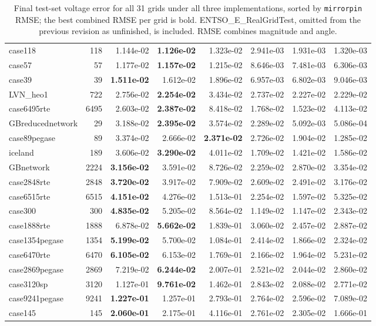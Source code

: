 \documentclass[10pt]{article}
\begin{document}
\begin{table}[H]
\begin{tabular}{lrrrrrrr}
case118 & 118 & 1.144e-02 & \textbf{1.126e-02} & 1.323e-02 & 2.941e-03 & 1.931e-03 & 1.320e-03 \\
case57 & 57 & 1.177e-02 & \textbf{1.157e-02} & 1.215e-02 & 8.646e-03 & 7.481e-03 & 6.306e-03 \\
case39 & 39 & \textbf{1.511e-02} & 1.612e-02 & 1.896e-02 & 6.957e-03 & 6.802e-03 & 9.046e-03 \\
LVN\_heo1 & 722 & 2.756e-02 & \textbf{2.254e-02} & 3.434e-02 & 2.737e-02 & 2.227e-02 & 2.229e-02 \\
case6495rte & 6495 & 2.603e-02 & \textbf{2.387e-02} & 8.418e-02 & 1.768e-02 & 1.523e-02 & 4.113e-02 \\
GBreducednetwork & 29 & 3.188e-02 & \textbf{2.395e-02} & 3.574e-02 & 2.289e-02 & 5.092e-03 & 5.086e-04 \\
case89pegase & 89 & 3.374e-02 & 2.666e-02 & \textbf{2.371e-02} & 2.726e-02 & 1.904e-02 & 1.285e-02 \\
iceland & 189 & 3.606e-02 & \textbf{3.290e-02} & 4.011e-02 & 1.709e-02 & 1.421e-02 & 1.586e-02 \\
GBnetwork & 2224 & \textbf{3.156e-02} & 3.591e-02 & 8.726e-02 & 2.259e-02 & 2.870e-02 & 3.354e-02 \\
case2848rte & 2848 & \textbf{3.720e-02} & 3.917e-02 & 7.909e-02 & 2.609e-02 & 2.491e-02 & 3.176e-02 \\
case6515rte & 6515 & \textbf{4.151e-02} & 4.276e-02 & 1.513e-01 & 2.254e-02 & 1.597e-02 & 5.325e-02 \\
case300 & 300 & \textbf{4.835e-02} & 5.205e-02 & 8.564e-02 & 1.149e-02 & 1.147e-02 & 2.343e-02 \\
case1888rte & 1888 & 6.878e-02 & \textbf{5.662e-02} & 1.839e-01 & 3.060e-02 & 2.457e-02 & 2.887e-02 \\
case1354pegase & 1354 & \textbf{5.199e-02} & 5.700e-02 & 1.084e-01 & 2.414e-02 & 1.866e-02 & 2.324e-02 \\
case6470rte & 6470 & \textbf{6.105e-02} & 6.153e-02 & 1.769e-01 & 2.166e-02 & 1.964e-02 & 5.231e-02 \\
case2869pegase & 2869 & 7.219e-02 & \textbf{6.244e-02} & 2.007e-01 & 2.521e-02 & 2.044e-02 & 2.860e-02 \\
case3120sp & 3120 & 1.127e-01 & \textbf{9.761e-02} & 1.462e-01 & 2.843e-02 & 2.088e-02 & 2.771e-02 \\
case9241pegase & 9241 & \textbf{1.227e-01} & 1.257e-01 & 2.793e-01 & 2.764e-02 & 2.596e-02 & 7.089e-02 \\
case145 & 145 & \textbf{2.060e-01} & 2.175e-01 & 4.116e-01 & 2.761e-02 & 2.305e-02 & 1.666e-01 \\
\bottomrule
\end{tabular}
\caption{Final test-set voltage error for all 31 grids under all three
implementations, sorted by \texttt{mirrorpin} RMSE; the best combined RMSE per
grid is bold. ENTSO\_E\_RealGridTest, omitted from the previous revision as
unfinished, is included. RMSE combines magnitude and angle.}
\end{table}
\end{document}
